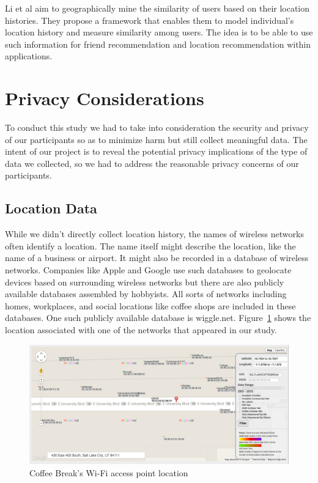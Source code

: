 \documentclass[letterpaper,twocolumn,10pt]{article}
\begin{document}
Li et al \cite{li} aim to geographically mine the similarity of users based on their location histories. They propose a framework that enables them to model individual’s location history and measure similarity among users. The idea is to be able to use such information for friend recommendation and location recommendation within applications. 


\section{Privacy Considerations}
To conduct this study we had to take into consideration the security and privacy of our participants so as to minimize harm but still collect meaningful data. The intent of our project is to reveal the potential privacy implications of the type of data we collected, so we had to address the reasonable privacy concerns of our participants.

\subsection{Location Data}
While we didn't directly collect location history, the names of wireless networks often identify a location. The name itself might describe the location, like the name of a business or airport. It might also be recorded in a database of wireless networks. Companies like Apple and Google use such databases to geolocate devices based on surrounding wireless networks but there are also publicly available databases assembled by hobbyists. All sorts of networks including homes, workplaces, and social locations like coffee shops are included in these databases. One such publicly available database is wiggle.net. Figure~\ref{wiggle} shows the location associated with one of the networks that appeared in our study.

\begin{figure}
\centering
\includegraphics[scale=.43]{wigle}
\caption{\textsf{Coffee Break's Wi-Fi access point location}}
\label{wiggle}
\end{figure}
\end{document}
